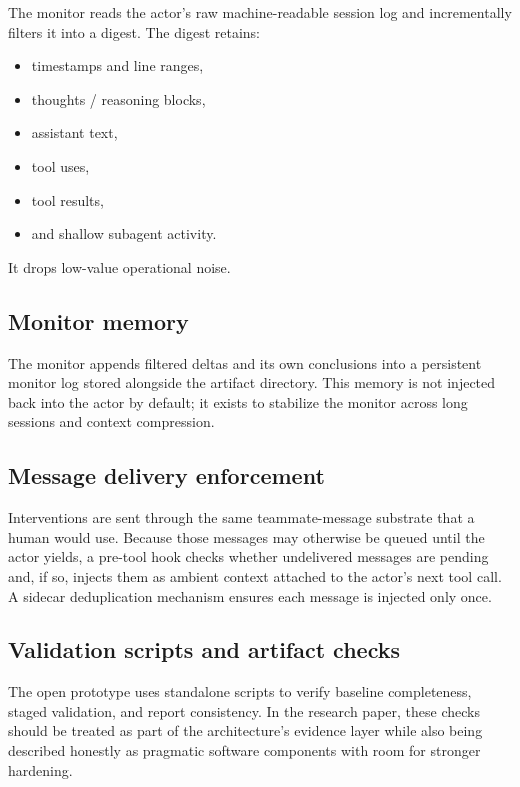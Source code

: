 \documentclass[11pt]{article}
\begin{document}
The monitor reads the actor's raw machine-readable session log and incrementally filters it into a digest. The digest retains:

\begin{itemize}[leftmargin=*,itemsep=2pt]
  \item timestamps and line ranges,
  \item thoughts / reasoning blocks,
  \item assistant text,
  \item tool uses,
  \item tool results,
  \item and shallow subagent activity.
\end{itemize}

It drops low-value operational noise.

\subsection{Monitor memory}

The monitor appends filtered deltas and its own conclusions into a persistent monitor log stored alongside the artifact directory. This memory is not injected back into the actor by default; it exists to stabilize the monitor across long sessions and context compression.

\subsection{Message delivery enforcement}

Interventions are sent through the same teammate-message substrate that a human would use. Because those messages may otherwise be queued until the actor yields, a pre-tool hook checks whether undelivered messages are pending and, if so, injects them as ambient context attached to the actor's next tool call. A sidecar deduplication mechanism ensures each message is injected only once.

\subsection{Validation scripts and artifact checks}

The open prototype uses standalone scripts to verify baseline completeness, staged validation, and report consistency. In the research paper, these checks should be treated as part of the architecture's evidence layer while also being described honestly as pragmatic software components with room for stronger hardening.
\end{document}
